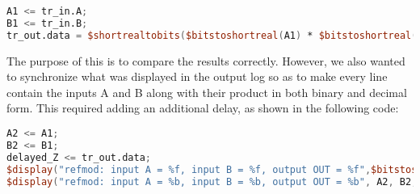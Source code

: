 \begin{lstlisting}[language = verilog]
A1 <= tr_in.A;
B1 <= tr_in.B;
tr_out.data = $shortrealtobits($bitstoshortreal(A1) * $bitstoshortreal(B1));	
\end{lstlisting}

The purpose of this is to compare the results correctly. However, we also wanted to synchronize what was displayed in the output log so as to make every line contain the inputs A and B along with their product in both binary and decimal form. This required adding an additional delay, as shown in the following code:
\begin{lstlisting}[language = verilog]
A2 <= A1;
B2 <= B1;
delayed_Z <= tr_out.data;
$display("refmod: input A = %f, input B = %f, output OUT = %f",$bitstoshortreal(A2), $bitstoshortreal(B2), $bitstoshortreal(delayed_Z));
$display("refmod: input A = %b, input B = %b, output OUT = %b", A2, B2, delayed_Z);
\end{lstlisting}